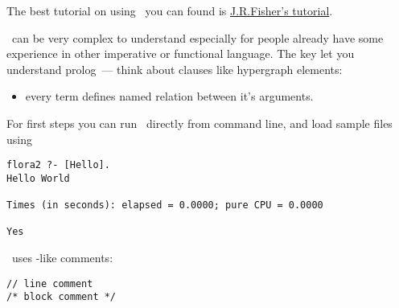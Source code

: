 \secdown

The best tutorial on using \prolog\ you can found is
\href{https://www.cpp.edu/~jrfisher/www/prolog_tutorial/contents.html}{J.R.Fisher's
tutorial}.

\bigskip
\prolog\ can be very complex to understand especially for people already have
some experience in other imperative or functional language. The key let you
understand prolog\ --- think about clauses like hypergraph elements:
\begin{itemize}
  \item 
every term defines named relation between it's arguments.
\end{itemize}

\clearpage
For first steps you can run \flora\ directly from command line, and load sample
files using



\begin{verbatim}
flora2 ?- [Hello].
Hello World

Times (in seconds): elapsed = 0.0000; pure CPU = 0.0000

Yes
\end{verbatim}



\flora\ uses \cpp-like comments:
\begin{verbatim}
// line comment
/* block comment */
\end{verbatim}

\secup